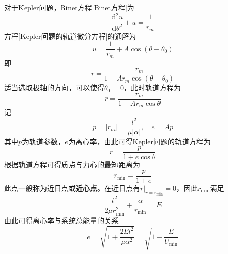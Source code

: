 对于Kepler问题，Binet方程\eqref{Binet方程}为
\begin{equation}
	\frac{\mathrm{d}^2 u}{\mathrm{d} \theta^2} + u = \frac{1}{r_m}
	\label{Kepler问题的轨道微分方程}
\end{equation}
方程\eqref{Kepler问题的轨道微分方程}的通解为
\begin{equation*}
	u = \frac{1}{r_m} + A\cos(\theta-\theta_0)
\end{equation*}
即
\begin{equation*}
	r = \frac{r_m}{1+Ar_m \cos (\theta-\theta_0)}
\end{equation*}
适当选取极轴的方向，可以使得$\theta_0=0$，此时轨道方程为
\begin{equation*}
	r = \frac{r_m}{1+Ar_m \cos \theta}
\end{equation*}
记
\begin{equation}
	p = |r_m| = \frac{l^2}{\mu |\alpha|},\quad e = Ap
	\label{chapter4:Kepler问题的轨道参数}
\end{equation}
其中$p$为{\heiti 轨道参数}，$e$为{\heiti 离心率}，由此可得Kepler问题的轨道方程为
\begin{equation}
	r = \frac{p}{1+e\cos \theta}
	\label{Kepler问题的轨道方程}
\end{equation}
根据轨道方程可得质点与力心的最短距离为
\begin{equation*}
	r_{\mathrm{min}} = \frac{p}{1+e}
\end{equation*}
此点一般称为{\heiti 近日点}或{\bf 近心点}。在近日点有$\dot{r}\big|_{r=r_{\mathrm{min}}} = 0$，因此$r_{\mathrm{min}}$满足
\begin{equation*}
	\frac{l^2}{2\mu r_{\mathrm{min}}^2} + \frac{\alpha}{r_{\mathrm{min}}} = E
\end{equation*}
由此可得离心率与系统总能量的关系
\begin{equation}
	e = \sqrt{1+\frac{2El^2}{\mu\alpha^2}} = \sqrt{1-\frac{E}{U_{\mathrm{min}}}}
\end{equation}

